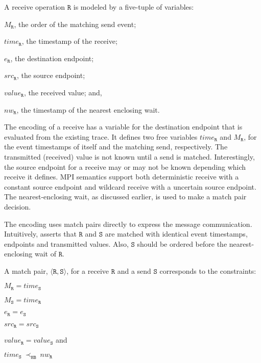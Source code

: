 \begin{definition}[Receive] \label{def:rcv}
A receive operation $\mathtt{R}$ is modeled by a five-tuple of variables:
\begin{compactenum}
\item $M_\mathtt{R}$, the order of the matching send event;
\item $\mathit{time}_\mathtt{R}$, the timestamp of the receive;
\item $e_\mathtt{R}$, the destination endpoint;
\item $src_\mathtt{R}$, the source endpoint;
\item $\mathit{value}_\mathtt{R}$, the received value; and,
\item $\mathit{nw}_\mathtt{R}$, the timestamp of the nearest enclosing wait.
\end{compactenum}
\end{definition}

The encoding of a receive has a variable for the destination endpoint that is evaluated from the existing trace. It defines two free variables $\mathit{time}_\mathtt{R}$ and $M_\mathtt{R}$, for the event timestamps of itself and the matching send, respectively. The transmitted (received) value is not known until a send is matched. Interestingly, the source endpoint for a receive may or may not be known depending which receive it defines. MPI semantics support both deterministic receive with a constant source endpoint and wildcard receive with a uncertain source endpoint. The nearest-enclosing wait, as discussed earlier, is used to make a match pair decision. 

The encoding uses match pairs directly to express the message communication. Intuitively,  asserts that $\mathtt{R}$ and $\mathtt{S}$ are matched with identical event timestamps, endpoints and transmitted values. Also, $\mathtt{S}$ should be ordered before the nearest-enclosing wait of $\mathtt{R}$. 

\begin{definition} \label{def:match}
A match pair, $\langle\mathtt{R}, \mathtt{S}\rangle$, for a receive
$\mathtt{R}$ and a send $\mathtt{S}$ corresponds to the constraints:
\begin{compactenum}
\item $M_{\mathtt{R}} = \mathit{time}_{\mathtt{S}}$
\item $M_{\mathtt{S}} = \mathit{time}_{\mathtt{R}}$
\item $e_{\mathtt{R}} = e_{\mathtt{S}}$
\item $src_\mathtt{R} = src_\mathtt{S}$
\item $\mathit{value}_{\mathtt{R}} = \mathit{value}_{\mathtt{S}}$ and
\item $\mathit{time}_{\mathtt{S}}\ \mathrm{\prec_\mathtt{HB}}\ \mathit{nw}_{\mathtt{R}}$
\end{compactenum}
\end{definition}

